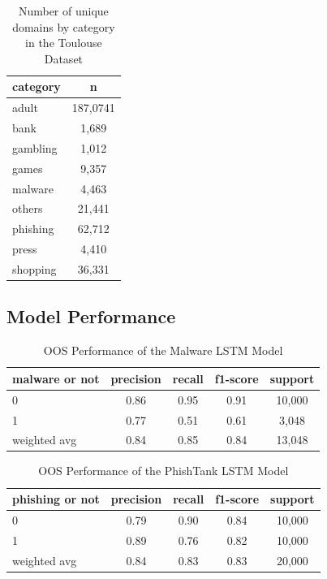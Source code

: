 \documentclass[12pt, letterpaper]{article}
\begin{document}
\begin{table}[h!]
\centering
\tiny
\caption{Number of unique domains by category in the Toulouse Dataset}
\begin{tabular}{ l c }
\hline
category  & n \\
\hline
adult     & 187,0741 \\
bank      & 1,689 \\
gambling  &  1,012 \\
games     &  9,357 \\
malware   &  4,463 \\
others    &  21,441 \\
phishing  &  62,712 \\
press     &  4,410 \\
shopping  &  36,331 \\
\hline
\end{tabular}
\label{tab:toulouse_data}
\end{table}
\clearpage

\subsection{Model Performance}

\begin{table}[!htb]
\centering
\tiny
\caption{OOS Performance of the Malware LSTM Model}
\begin{tabular}{ l c c c c }
\hline
    malware or not & precision & recall & f1-score & support \\
\hline
      0  &         0.86 &     0.95   &    0.91  &   10,000\\
      1  &         0.77 &     0.51   &    0.61  &   3,048 \\
weighted avg  &     0.84 &     0.85   &    0.84  &   13,048 \\
\hline
\end{tabular}
\label{tab:malware_model}
\end{table}

\begin{table}[!htb]
\centering
\tiny
\caption{OOS Performance of the PhishTank LSTM Model}
\begin{tabular}{ l c c c c }
\hline
    phishing or not & precision & recall & f1-score & support \\
\hline
      0  &         0.79 &     0.90   &    0.84  &   10,000\\
      1  &         0.89 &     0.76   &    0.82  &   10,000 \\
weighted avg  &     0.84 &     0.83   &    0.83  &   20,000 \\
\hline
\end{tabular}
\label{tab:phishtank_model}
\end{table}
\end{document}

